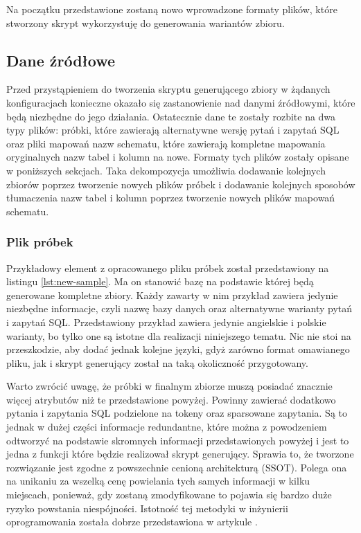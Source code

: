 Na początku przedstawione zostaną nowo wprowadzone formaty plików, które stworzony skrypt wykorzystuję do generowania wariantów zbioru.

\subsection{Dane źródłowe}
Przed przystąpieniem do tworzenia skryptu generującego zbiory w żądanych konfiguracjach konieczne okazało się zastanowienie nad danymi źródłowymi, które będą niezbędne do jego działania. Ostatecznie dane te zostały rozbite na dwa typy plików: próbki, które zawierają alternatywne wersję pytań i zapytań SQL oraz pliki mapowań nazw schematu, które zawierają kompletne mapowania oryginalnych nazw tabel i kolumn na nowe. Formaty tych plików zostały opisane w poniższych sekcjach. Taka dekompozycja umożliwia dodawanie kolejnych zbiorów poprzez tworzenie nowych plików próbek i dodawanie kolejnych sposobów tłumaczenia nazw tabel i kolumn poprzez tworzenie nowych plików mapowań schematu.

\subsubsection{Plik próbek}
Przykładowy element z opracowanego pliku próbek został przedstawiony na listingu \ref{lst:new-sample}. Ma on stanowić bazę na podstawie której będą generowane kompletne zbiory. Każdy zawarty w nim przykład zawiera jedynie niezbędne informacje, czyli nazwę bazy danych oraz alternatywne warianty pytań i zapytań SQL. Przedstawiony przykład zawiera jedynie angielskie i polskie warianty, bo tylko one są istotne dla realizacji niniejszego tematu. Nic nie stoi na przeszkodzie, aby dodać jednak kolejne języki, gdyż zarówno format omawianego pliku, jak i skrypt generujący został na taką okoliczność przygotowany.

\begin{minipage}{\linewidth}

\end{minipage}

Warto zwrócić uwagę, że próbki w finalnym zbiorze muszą posiadać znacznie więcej atrybutów niż te przedstawione powyżej. Powinny zawierać dodatkowo pytania i zapytania SQL podzielone na tokeny oraz sparsowane zapytania. Są to jednak w dużej części informacje redundantne, które można z powodzeniem odtworzyć na podstawie skromnych informacji przedstawionych powyżej i jest to jedna z funkcji które będzie realizował skrypt generujący. Sprawia to, że tworzone rozwiązanie jest zgodne z powszechnie cenioną architekturą  (SSOT). Polega ona na unikaniu za wszelką cenę powielania tych samych informacji w kilku miejscach, ponieważ, gdy zostaną zmodyfikowane to pojawia się bardzo duże ryzyko powstania niespójności. Istotność tej metodyki w inżynierii oprogramowania została dobrze przedstawiona w artykule  \cite{Pang2014}.

